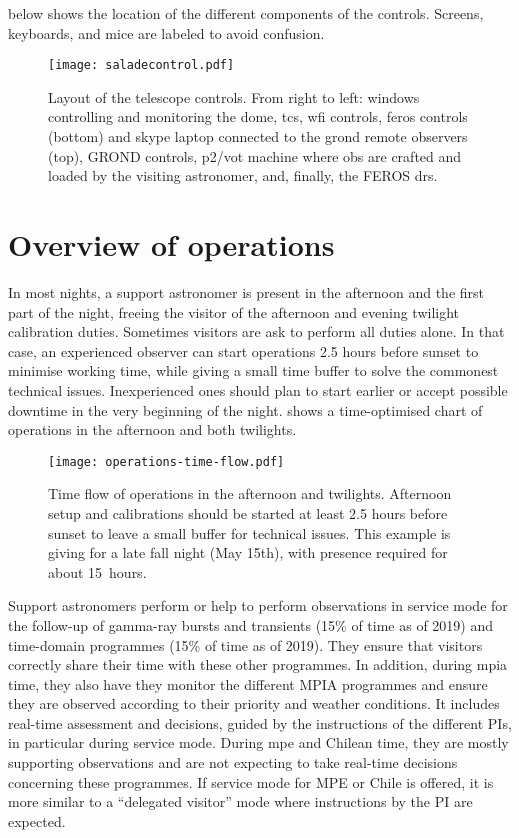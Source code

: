 \documentclass[11pt,fleqn,a4paper]{book}
\begin{document}
  below shows the location of the different components of the controls.  Screens, keyboards, and mice are labeled to avoid confusion.

\begin{figure}[!ht] \texttt{[image: saladecontrol.pdf]}
\caption[Layout of the telescope controls]{Layout of the telescope controls.  From right to left: \gls{windows} 
controlling and monitoring the \gls{dome}, \acrlong{tcs}, \acrshort{wfi} controls,
\acrshort{feros} controls (bottom) and skype laptop connected to the \acrshort{grond} remote observers (top), GROND controls, \acrshort{p2}/\acrshort{vot} machine where
\acrshort{ob}s are crafted and loaded by the visiting astronomer, and,
finally, the FEROS \acrlong{drs}.}
\label{fig:saladecontrol} 
\end{figure}

\section{Overview of operations}

In most nights, a support astronomer is present in the afternoon and the first part of the night, freeing the \gls{visitor} of the afternoon and evening twilight calibration duties.  Sometimes visitors are ask to perform all duties alone.  In that case, an experienced observer can start operations 2.5 hours before sunset to minimise working time, while giving a small time buffer to solve the commonest technical issues.  Inexperienced ones should plan to start earlier or accept possible downtime in the very beginning of the night.  shows a time-optimised chart of operations in the afternoon and both twilights.

\begin{figure}[!ht]
\texttt{[image: operations-time-flow.pdf]}
\caption[Time flow of afternoon and twilight observations]{Time flow of operations in the afternoon and twilights. Afternoon setup and calibrations should be started at least 2.5 hours before sunset to leave a small buffer for technical issues. This example is giving for a late fall night (May 15th), with presence required for about 15~hours.}
\label{fig:timeflow}
\end{figure}

Support astronomers perform or help to perform observations in \gls{service} mode for the follow-up of gamma-ray bursts and transients (15\% of time as of 2019) and time-domain programmes (15\% of time as of 2019). They ensure that \glspl{visitor} correctly share their time with these other programmes.  In addition, during \gls{mpia} time, they also have they monitor the different MPIA programmes and ensure they are observed according to their priority and weather conditions. It includes real-time assessment and decisions, guided by the instructions of the different PIs, in particular during service mode.  During \gls{mpe} and Chilean time, they are mostly supporting observations and are not expecting to take real-time decisions concerning these programmes.  If service mode for MPE or Chile is offered, it is more similar to a ``delegated visitor'' mode where instructions by the PI are expected.
\end{document}
